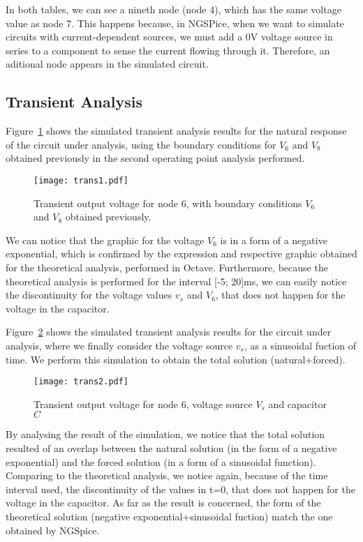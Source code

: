 In both tables, we can see a nineth node (node 4), which has the same voltage value as node 7. This happens because, in NGSPice, when we want to simulate circuits with current-dependent sources, we must add a 0V voltage source in series to a component to sense the current flowing through it. Therefore, an aditional node appears in the simulated circuit.


\subsection{Transient Analysis}


Figure~\ref{fig:trans1} shows the simulated transient analysis results for the natural response of 
the circuit under analysis, using the boundary conditions for $V_6$ and $V_8$ obtained previously
in the second operating point analysis performed. 

\begin{figure}[H] \centering
\texttt{[image: trans1.pdf]}
\caption{Transient output voltage for node 6, with boundary conditions $V_6$ and $V_8$ obtained previously.}
\label{fig:trans1}
\end{figure}

We can notice that the graphic for the voltage $V_6$ is in a form of a negative exponential, 
which is confirmed by the expression and respective graphic obtained for the theoretical 
analysis, performed in Octave. Furthermore, because the theoretical analysis is performed
for the interval [-5; 20]ms, we can easily notice the discontinuity for the voltage values
$v_s$ and $V_6$, that does not happen for the voltage in the capacitor.


Figure~\ref{fig:trans2} shows the simulated transient analysis results for the
circuit under analysis, where we finally consider the voltage source $v_s$,
as a sinusoidal fuction of time. We perform this simulation to obtain the total
solution (natural+forced).

\begin{figure}[H] \centering
\texttt{[image: trans2.pdf]}
\caption{Transient output voltage for node 6, voltage source $V_s$ and capacitor $C$}
\label{fig:trans2}
\end{figure}

By analysing the result of the simulation, we notice that the total solution resulted 
of an overlap between the natural solution (in the form of a negative exponential) and
the forced solution (in a form of a sinusoidal function). Comparing to the theoretical
analysis, we notice again, because of the time interval used, the discontinuity of the 
values in t=0, that does not happen for the voltage in the capacitor. As far as the result
is concerned, the form of the theoretical solution (negative exponential+sinusoidal fuction)
match the one obtained by NGSpice.


